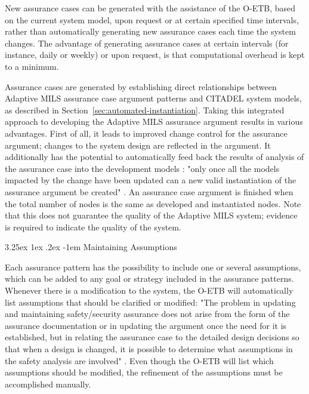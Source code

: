 \documentclass[12pt,twoside,a4paper]{article}
\makeatletter
\renewcommand\paragraph{\@startsection{paragraph}{5}{\z@}%
  {3.25ex \@plus1ex \@minus.2ex}%
  {-1em}%
  {\normalfont\normalsize\bfseries}}
\makeatother
\begin{document}
New assurance cases can be generated with the assistance of the O-ETB, based on the current system model, upon request or at certain specified time intervals, rather than automatically generating new assurance cases each time the system changes. The advantage of generating assurance cases at certain intervals (for instance, daily or weekly) or upon request, is that computational overhead is kept to a minimum.  

Assurance cases are generated by establishing direct relationships between Adaptive MILS assurance case argument patterns and CITADEL system models, as described in Section~\ref{sec:automated-instantiation}. Taking this integrated approach to developing the Adaptive MILS assurance argument results in various advantages. First of all, it leads to improved change control for the assurance argument; changes to the system design are reflected in the argument. It additionally has the potential to automatically feed back the results of analysis of the assurance case into the development models \cite{D-MILS-D2.4}: "only once all the models impacted by the change have been updated can a new valid instantiation of the assurance argument be created" \cite{D-MILS-D2.4}. An assurance case argument is finished when the total number of nodes is the same as developed and instantiated nodes. Note that this does not guarantee the quality of the Adaptive MILS system; evidence is required to indicate the quality of the system.

\paragraph{Maintaining Assumptions}

Each assurance pattern has the possibility to include one or several assumptions, which can be added to any goal or strategy included in the assurance patterns. Whenever there is a modification to the system, the O-ETB will automatically list assumptions that should be clarified or modified: "The problem in updating and maintaining safety/security assurance does not arise from the form of the assurance documentation or in updating the argument once the need for it is established, but in relating the assurance case to the detailed design decisions so that when a design is changed, it is possible to determine what assumptions in the safety analysis are involved" \cite{Weinstock07arguing-security}. Even though the O-ETB will list which assumptions should be modified, the refinement of the assumptions must be accomplished manually. 
\end{document}
